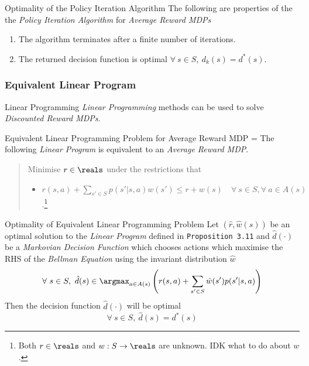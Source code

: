 \documentclass[11pt,a4paper]{article}
\begin{document}
  \begin{theorem}{Optimality of the Policy Iteration Algorithm}
    The following are properties of the the \textit{Policy Iteration Algorithm} for \textit{Average Reward MDPs}
    \begin{enumerate}
      \item The algorithm terminates after a finite number of iterations.
      \item The returned decision function is optimal $\forall\ s\in S,\ d_k(s)=d^*(s)$.
    \end{enumerate}
  \end{theorem}

\subsubsection{Equivalent Linear Program}

  \begin{remark}{Linear Programming}
    \textit{Linear Programming} methods can be used to solve \textit{Discounted Reward MDPs}.
  \end{remark}

  \begin{proposition}{Equivalent Linear Programming Problem for Average Reward MDP}
    \everymath={\displaystyle}
    The following \textit{Linear Program} is equivalent to an \textit{Average Reward MDP}.
    \begin{quote}
      Minimise $r\in\reals$ under the restrictions that
      \begin{itemize}
        \item $r(s,a)+\sum_{s'\in S}p(s'|s,a)w(s')\leq r+w(s)\quad\forall\ s\in S,\forall\ a\in A(s)$.\footnote{Both $r\in\reals$ and $w:S\to\reals$ are unknown. IDK what to do about $w$.}
      \end{itemize}
    \end{quote}
  \end{proposition}

  \begin{theorem}{Optimality of Equivalent Linear Programming Problem}
    Let $(\hat{r},\hat{w}(s))$ be an optimal solution to the \textit{Linear Program} defined in \texttt{Proposition 3.11} and $\hat{d}(\cdot)$ be a \textit{Markovian Decision Function} which chooses actions which maximise the RHS of the \textit{Bellman Equation} using the invariant distribution $\hat{w}$
    \[ \forall\ s\in S,\ \hat{d}(s)\in\argmax_{a\in A(s)}\left(r(s,a)+\sum_{s'\in S}\hat{w}(s')p(s'|s,a)\right) \]
    Then the decision function $\hat{d}(\cdot)$ will be optimal
    \[ \forall\ s\in S,\ \hat{d}(s)=d^*(s) \]
  \end{theorem}
\end{document}
